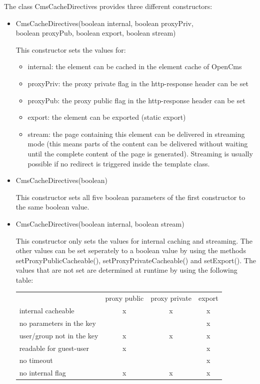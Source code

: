 The class {\class CmsCacheDirectives} provides three different constructors:
\begin{itemize}
\item 
\begin{java}
CmsCacheDirectives(boolean internal, boolean proxyPriv,\\
\jtabb		boolean proxyPub, boolean export, boolean stream)\\
\end{java}

This constructor sets the values for:
\begin{itemize}
\item internal: the element can be cached in the element cache of OpenCms
\item proxyPriv: the proxy private flag in the http-response header can be set
\item proxyPub: the proxy public flag in the http-response header can be set
\item export: the element can be exported (static export)
\item stream: the page containing this element can be delivered in streaming mode 
(this means parts of the content can be delivered without waiting until the complete 
content of the page is generated). 
Streaming is usually possible if no redirect is triggered  inside the template class.
\end{itemize}
\item 
\begin{java}
CmsCacheDirectives(boolean)\\
\end{java}
This constructor sets all five boolean parameters of the first constructor to the same boolean value.
\item
\begin{java}
CmsCacheDirectives(boolean internal, boolean stream)\\
\end{java}

This constructor only sets the values for internal caching and streaming. 
The other values can be set seperately to a boolean value by using the methods\\ 
{\meth setProxyPublicCacheable()}, {\meth setProxyPrivateCacheable()} and {\meth setExport()}. 
The values that are not set are determined at runtime by using the following table:


\begin{tabular}{lccc}
& proxy public & proxy private & export \\[0.5ex]
internal cacheable & x & x & x \\
no parameters in the key & & & x \\
user/group not in the key & x & x & x \\
readable for guest-user	& x & & x \\
no timeout & & & x \\
no internal flag & x & x & x \\
\end{tabular}


\end{itemize}
